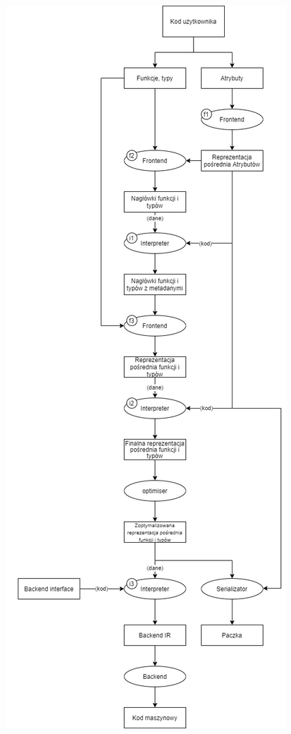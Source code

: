 \begin{figure}[]
    \label{compilation_process_diagram}
    \includegraphics[width=\textwidth,height=\textheight,keepaspectratio]{img/compilation_process.png}
    \centering
\end{figure}

